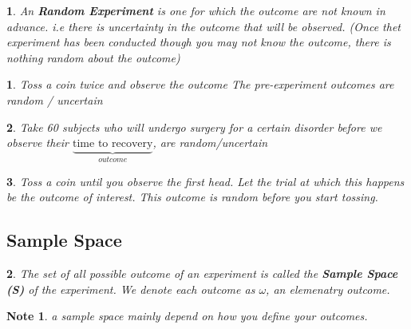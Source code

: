 \documentclass[11pt]{article}
\newtheorem*{note}{Note}
\newtheorem{definition}{\framebox{DEF}}[section]
\newtheorem{example}{\framebox{Ex}}[section]
\begin{document}
                \begin{definition}
                    An \textbf{\textit{Random Experiment}} is one for which the outcome are not known in advance. 
                    i.e there is uncertainty in the outcome that will be observed. 
                    (Once thet experiment has been conducted though you may not know the outcome, there is nothing random about the outcome)
                \end{definition}

                \begin{example}
                         Toss a coin twice and observe the outcome
                         The pre-experiment outcomes are random / uncertain 
                \end{example}

                \begin{example}
                    Take 60 subjects who will undergo surgery for a certain disorder before we observe their 
                    $\underbrace{\text{time to recovery}}_{outcome}$, are random/uncertain
                \end{example}

                \begin{example}
                    Toss a coin until you observe the first head. Let the trial at which this happens be the outcome of interest.
                    This outcome is random before you start tossing.
                \end{example}
            
            \subsection{Sample Space}
                \begin{definition}
                    The set of all possible outcome of an experiment is called the \textbf{\textit{Sample Space (S)}}
                    of the experiment. We denote each outcome as $\omega$, an elemenatry outcome.
                \end{definition}

                \begin{note}
                    a sample space mainly depend on how you define your outcomes.
                \end{note}
\end{document}
